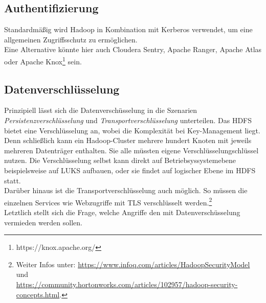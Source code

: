 \subsection{Authentifizierung}
Standardmäßig wird Hadoop in Kombination mit Kerberos verwendet, um eine allgemeinen Zugriffsschutz zu ermöglichen.\cite{hadoop_security}\\
Eine Alternative könnte hier auch Cloudera Sentry, Apache Ranger, Apache Atlas oder Apache Knox\footnote{https://knox.apache.org/} sein.
\subsection{Datenverschlüsselung}
Prinzipiell lässt sich die Datenverschüsselung in die Szenarien \textit{Persistenzverschlüsselung} und \textit{Transportverschlüsselung} unterteilen. Das HDFS bietet eine Verschlüsselung an, wobei die Komplexität bei Key-Management liegt. Denn schließlich kann ein Hadoop-Cluster mehrere hundert Knoten mit jeweils mehreren Datenträger enthalten. Sie alle müssten eigene Verschlüsselungschlüssel nutzen. Die Verschlüsselung selbst kann direkt auf Betriebsyssystemebene beispielsweise auf LUKS aufbauen, oder sie findet auf logischer Ebene im HDFS statt.\cite{hadoop_security}\\

\noindent
Darüber hinaus ist die Transportverschlüsselung auch möglich. So müssen die einzelnen Services wie Webzugriffe  mit TLS verschlüsselt werden.\footnote{Weiter Infos unter: \url{https://www.infoq.com/articles/HadoopSecurityModel} und\\ \url{https://community.hortonworks.com/articles/102957/hadoop-security-concepts.html}.}\\


\noindent
Letztlich stellt sich die Frage, welche Angriffe den mit Datenverschüsselung vermieden werden sollen. 